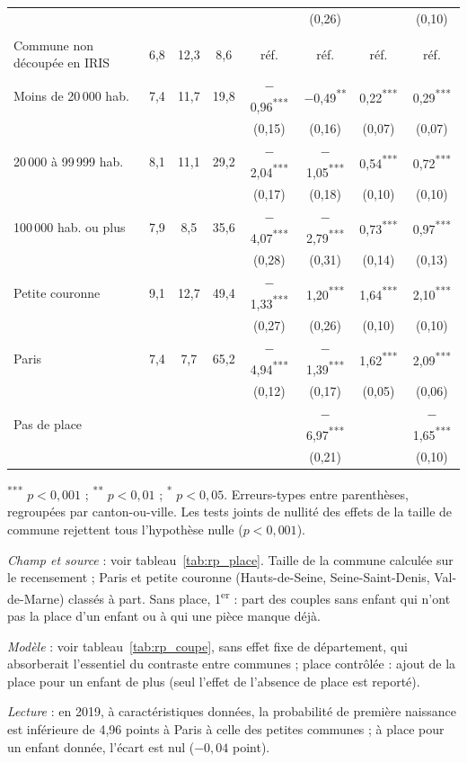 \documentclass[11pt,a4paper]{article}
\theoremstyle{plain}
\theoremstyle{definition}
\theoremstyle{remark}
\newcommand{\sym}[1]{\textsuperscript{#1}}
\begin{document}
\begin{table}[htbp]
\begin{threeparttable}
\begin{tabular}{@{}lccccccc@{}}
  &  &  &  &  & (0,26) &  & (0,10) \\
\addlinespace
\multicolumn{8}{@{}l}{\textit{B. RP 2023}} \\
Commune non découpée en IRIS & 6,8 & 12,3 & 8,6 & réf. & réf. & réf. & réf. \\
Moins de 20\,000 hab. & 7,4 & 11,7 & 19,8 & $-$0,96\sym{***} & $-$0,49\sym{**} & 0,22\sym{***} & 0,29\sym{***} \\
  &  &  &  & (0,15) & (0,16) & (0,07) & (0,07) \\
20\,000 à 99\,999 hab. & 8,1 & 11,1 & 29,2 & $-$2,04\sym{***} & $-$1,05\sym{***} & 0,54\sym{***} & 0,72\sym{***} \\
  &  &  &  & (0,17) & (0,18) & (0,10) & (0,10) \\
100\,000 hab. ou plus & 7,9 & 8,5 & 35,6 & $-$4,07\sym{***} & $-$2,79\sym{***} & 0,73\sym{***} & 0,97\sym{***} \\
  &  &  &  & (0,28) & (0,31) & (0,14) & (0,13) \\
Petite couronne & 9,1 & 12,7 & 49,4 & $-$1,33\sym{***} & 1,20\sym{***} & 1,64\sym{***} & 2,10\sym{***} \\
  &  &  &  & (0,27) & (0,26) & (0,10) & (0,10) \\
Paris & 7,4 & 7,7 & 65,2 & $-$4,94\sym{***} & $-$1,39\sym{***} & 1,62\sym{***} & 2,09\sym{***} \\
  &  &  &  & (0,12) & (0,17) & (0,05) & (0,06) \\
Pas de place &  &  &  &  & $-$6,97\sym{***} &  & $-$1,65\sym{***} \\
  &  &  &  &  & (0,21) &  & (0,10) \\
\bottomrule
\end{tabular}
\begin{tablenotes}\scriptsize
\item \sym{***} $p<0{,}001$ ; \sym{**} $p<0{,}01$ ; \sym{*} $p<0{,}05$. Erreurs-types entre parenthèses, regroupées par canton-ou-ville. Les tests joints de nullité des effets de la taille de commune rejettent tous l'hypothèse nulle ($p < 0{,}001$).
\item \textit{Champ et source} : voir tableau~\ref{tab:rp_place}. Taille de la commune calculée sur le recensement ; Paris et petite couronne (Hauts-de-Seine, Seine-Saint-Denis, Val-de-Marne) classés à part. Sans place, 1\textsuperscript{er} : part des couples sans enfant qui n'ont pas la place d'un enfant ou à qui une pièce manque déjà.
\item \textit{Modèle} : voir tableau~\ref{tab:rp_coupe}, sans effet fixe de département, qui absorberait l'essentiel du contraste entre communes ; place contrôlée : ajout de la place pour un enfant de plus (seul l'effet de l'absence de place est reporté).
\item \textit{Lecture} : en 2019, à caractéristiques données, la probabilité de première naissance est inférieure de 4,96 points à Paris à celle des petites communes ; à place pour un enfant donnée, l'écart est nul ($-0{,}04$ point).
\end{tablenotes}
\end{threeparttable}
\end{table}
\end{document}
